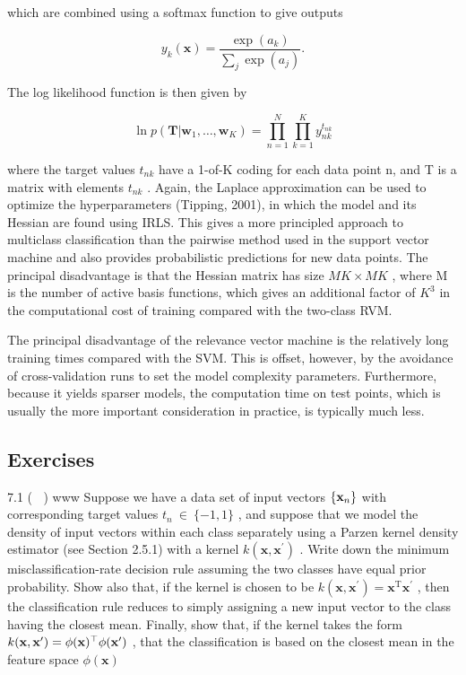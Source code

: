 \documentclass[
  10
]{article}
\begin{document}
which are combined using a softmax function to give outputs

\[
y _ {k} (\mathbf {x}) = \frac {\exp (a _ {k})}{\sum_ {j} \exp (a _ {j})}.\tag{7.121}
\]

The log likelihood function is then given by

\[
\ln p (\mathbf {T} | \mathbf {w} _ {1}, \dots , \mathbf {w} _ {K}) = \prod_ {n = 1} ^ {N} \prod_ {k = 1} ^ {K} y _ {n k} ^ {t _ {n k}}\tag{7.122}
\]

where the target values \(t _ { n k }\) have a 1-of-K coding for each
data point n, and T is a matrix with elements \(t _ { n k }\) . Again,
the Laplace approximation can be used to optimize the hyperparameters
(Tipping, 2001), in which the model and its Hessian are found using
IRLS. This gives a more principled approach to multiclass classification
than the pairwise method used in the support vector machine and also
provides probabilistic predictions for new data points. The principal
disadvantage is that the Hessian matrix has size \(M K \times M K\) ,
where M is the number of active basis functions, which gives an
additional factor of \(K ^ { 3 }\) in the computational cost of training
compared with the two-class RVM.

The principal disadvantage of the relevance vector machine is the
relatively long training times compared with the SVM. This is offset,
however, by the avoidance of cross-validation runs to set the model
complexity parameters. Furthermore, because it yields sparser models,
the computation time on test points, which is usually the more important
consideration in practice, is typically much less.

\subsection{Exercises}\label{exercises-3}

7.1 ( ) www Suppose we have a data set of input vectors
\(\left\{ { \bf x } _ { n } \right\}\) with corresponding target values
\(t _ { n } ~ \in ~ \{ - 1 , 1 \}\) , and suppose that we model the
density of input vectors within each class separately using a Parzen
kernel density estimator (see Section 2.5.1) with a kernel
\(k ( \mathbf { x } , \mathbf { x } ^ { \prime } )\) . Write down the
minimum misclassification-rate decision rule assuming the two classes
have equal prior probability. Show also that, if the kernel is chosen to
be
\(k ( \mathbf { x } , \mathbf { x } ^ { \prime } ) = \mathbf { x } ^ { \mathrm { { T } } } \mathbf { x } ^ { \prime }\)
, then the classification rule reduces to simply assigning a new input
vector to the class having the closest mean. Finally, show that, if the
kernel takes the form
\(k ( { \bf x } , { \bf x } ^ { \prime } ) = \phi ( { \bf x } ) ^ { \top } \phi ( { \bf x } ^ { \prime } )\)
, that the classification is based on the closest mean in the feature
space \(\phi ( \mathbf { x } )\)
\end{document}

